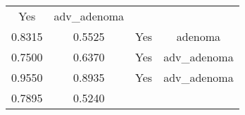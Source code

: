 \documentclass[12pt,]{article}
\begin{document}
\begin{longtable}[]{@{}cccc@{}}
\begin{minipage}[t]{0.22\columnwidth}
Yes\strut
\end{minipage} & \begin{minipage}[t]{0.16\columnwidth}\centering\strut
adv\_adenoma\strut
\end{minipage}\tabularnewline
\begin{minipage}[t]{0.24\columnwidth}\centering\strut
0.8315\strut
\end{minipage} & \begin{minipage}[t]{0.26\columnwidth}\centering\strut
0.5525\strut
\end{minipage} & \begin{minipage}[t]{0.22\columnwidth}\centering\strut
Yes\strut
\end{minipage} & \begin{minipage}[t]{0.16\columnwidth}\centering\strut
adenoma\strut
\end{minipage}\tabularnewline
\begin{minipage}[t]{0.24\columnwidth}\centering\strut
0.7500\strut
\end{minipage} & \begin{minipage}[t]{0.26\columnwidth}\centering\strut
0.6370\strut
\end{minipage} & \begin{minipage}[t]{0.22\columnwidth}\centering\strut
Yes\strut
\end{minipage} & \begin{minipage}[t]{0.16\columnwidth}\centering\strut
adv\_adenoma\strut
\end{minipage}\tabularnewline
\begin{minipage}[t]{0.24\columnwidth}\centering\strut
0.9550\strut
\end{minipage} & \begin{minipage}[t]{0.26\columnwidth}\centering\strut
0.8935\strut
\end{minipage} & \begin{minipage}[t]{0.22\columnwidth}\centering\strut
Yes\strut
\end{minipage} & \begin{minipage}[t]{0.16\columnwidth}\centering\strut
adv\_adenoma\strut
\end{minipage}\tabularnewline
\begin{minipage}[t]{0.24\columnwidth}\centering\strut
0.7895\strut
\end{minipage} & \begin{minipage}[t]{0.26\columnwidth}\centering\strut
0.5240\strut
\end{minipage} & \begin{minipage}[t]{0.22\columnwidth}\centering\strut

\end{minipage}
\end{longtable}
\end{document}
